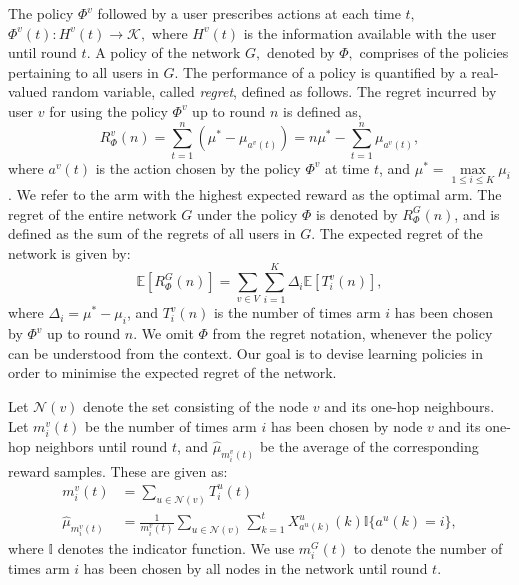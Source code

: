 \documentclass{article}
\begin{document}
The policy $\Phi^v$ followed by a user prescribes actions at each time $t,$ $\Phi^v(t): H^v(t) \rightarrow \mathcal{K},$ where $H^v(t)$ is the information available with the user until round $t.$ A policy of the network $G,$ denoted by $\Phi,$ comprises of the policies pertaining to all users in $G.$ The performance of a policy is quantified by a real-valued random variable, called \textit{regret}, defined as follows. The regret incurred by user $v$ for using the policy $\Phi^v$ up to round $n$ is defined as,
\begin{equation*}
\label{eq:2.1}
R^v_{\Phi}(n) = \sum\limits_{t=1}^n \left( \mu^* - \mu_{a^v(t)} \right)  = n \mu^* - \sum\limits_{t=1}^n \mu_{a^v(t)},
\end{equation*}
where $a^v(t)$ is the action chosen by the policy $\Phi^v$ at time $t$, and $\mu^* = \max\limits_{1 \leq i \leq K} \mu_i$. We refer to the arm with the highest expected reward as the optimal arm. The regret of the entire network $G$ under the policy $\Phi$ is denoted by $R^G_{\Phi}(n)$, and is defined as the sum of the regrets of all users in $G$. The expected regret of the network is given by:
\begin{equation}
\label{eq:2.3}
\mathbb{E} [ R^G_{\Phi}(n) ] = \sum \limits_{v \in V} \sum\limits_{i=1}^K \Delta_i \mathbb{E}  [ T_i^v(n) ],
\end{equation}
where $\Delta_i = \mu^* - \mu_i$, and $T_i^v(n)$ is the number of times arm $i$ has been chosen by $\Phi^v$ up to round $n$. We omit $\Phi$ from the regret notation, whenever the policy can be understood from the context. Our goal is to devise learning policies in order to minimise the expected regret of the network.

Let $\mathcal{N}(v)$ denote the set consisting of the node $v$ and its one-hop neighbours. Let $m^v_i(t)$ be the number of times arm $i$ has been chosen by node $v$ and its one-hop neighbors until round $t$, and  $\hat{\mu}_{m_i^v(t)}$ be the average of the corresponding reward samples. These are given as:
\begin{align*}
m^v_i(t)  &= \sum\limits_{u \in \mathcal{N}(v)} T_i^u(t) \\
\hat{\mu}_{m_i^v(t)} &=\frac{1}{{m_i^v(t)}} \sum\limits_{u \in \mathcal{N}(v)} \sum\limits_{k=1}^{t} X_{a^u(k)}^u(k) \mathbb{I} \lbrace a^u(k) = i \rbrace,
\end{align*}
where $\mathbb{I}$ denotes the indicator function. We use $m^G_i(t)$ to denote the number of times arm $i$ has been chosen by all nodes in the network until round $t$.
\end{document}
